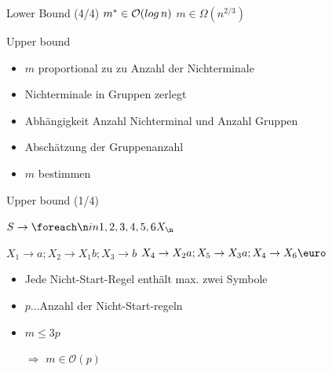 \begin{frame}{\FrameName}
\begin{block}{Lower Bound (4/4)}
	\StringDefinition	
		$m^* \in \mathcal{O}(log \thinspace n)$ \hfill $m \in \Omega(n^{2/3})$ \linebreak 
		\begin{center}
		\end{center}
\end{block}
\end{frame}

\begin{frame}{\FrameName}
	\begin{block}{Upper bound}
		\begin{itemize}[<+->]
			\item $m$ proportional zu zu Anzahl der Nichterminale
			\item Nichterminale in Gruppen zerlegt
			\item Abhängigkeit Anzahl Nichterminal und Anzahl Gruppen
			\item Abschätzung der Gruppenanzahl
			\item $m$ bestimmen
		\end{itemize}
	\end{block}
	\end{frame}

	\begin{frame}{\FrameName}
		\begin{block}{Upper bound (1/4)}
			\begin{center}
				$S \rightarrow \foreach \n in {1,2,3,4,5,6}{X_{\n}}$ 
				
	
				$X_1 \rightarrow a; X_2 \rightarrow X_1b;  X_3 \rightarrow b$
				$X_4 \rightarrow X_2a; X_5 \rightarrow X_3a; X_4 \rightarrow X_6\text{\euro}$
			\end{center}
			\begin{itemize}[<+->]
				\item Jede Nicht-Start-Regel enthält max. zwei Symbole
				\item $p$...Anzahl der Nicht-Start-regeln
				\item $m \le 3p$
				\item[$\Rightarrow$] $m \in \mathcal{O}(p)$
			\end{itemize}
		\end{block}
		\end{frame}

